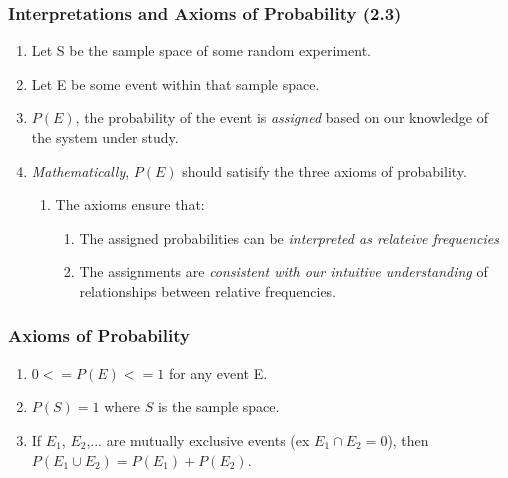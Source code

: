 \documentclass[../INDE315.tex]{subfiles}
\begin{document}
\subsubsection*{Interpretations and Axioms of Probability (2.3)}
\begin{enumerate}
    \item Let S be the sample space of some random experiment.
    \item Let E be some event within that sample space.
    \item $P(E)$, the probability of the event is \emph{assigned} based on our knowledge of the system under study.
    \item \emph{Mathematically}, $P(E)$ should satisify the three axioms of probability.
        \begin{enumerate}
            \item The axioms ensure that:
                \begin{enumerate}
                    \item The assigned probabilities can be \emph{interpreted as relateive frequencies}
                    \item The assignments are \emph{consistent with our intuitive understanding} of relationships between relative frequencies.
                \end{enumerate}
        \end{enumerate}
\end{enumerate}

\subsubsection*{Axioms of Probability}
\begin{enumerate}
    \item $0 <= P(E) <= 1$ for any event E.
    \item $P(S) = 1$ where $S$ is the sample space.
    \item If $E_1$, $E_2$,... are mutually exclusive events (ex $E_1 \cap E_2 = 0$), then $P(E_1 \cup E_2) = P(E_1) + P(E_2)$.
\end{enumerate}
\end{document}
